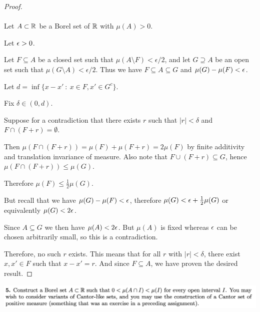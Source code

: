 \begin{proof}~\\~\\
  Let $A \subset \mathbb{R}$ be a Borel set of $\mathbb{R}$ with $\mu(A) > 0$.

  Let $\epsilon > 0$.

  Let $F \subseteq A$ be a closed set such that $\mu(A \setminus F) < \epsilon/2$, and let $G \supseteq A$ be
  an open set such that $\mu(G \setminus A) < \epsilon/2$. Thus we have $F \subseteq A \subseteq G$
  and $\mu(G) - \mu(F) < \epsilon$.

  Let $d = \inf \{ x - x' ~:~ x \in F, x' \in G^c\}$.

  Fix $\delta \in (0, d)$.

  Suppose for a contradiction that there exists $r$ such that $|r| < \delta$ and $F \cap (F + r) = \emptyset$.

  Then $\mu(F \cap (F + r)) = \mu(F) + \mu(F + r) = 2\mu(F)$ by finite additivity and translation invariance of
  measure. Also note that $F \cup (F + r) \subseteq G$, hence $\mu(F \cap (F + r)) \leq \mu(G)$.

  Therefore $\mu(F) \leq \frac{1}{2}\mu(G)$.

  But recall that we have $\mu(G) - \mu(F) < \epsilon$, therefore $\mu(G) < \epsilon + \frac{1}{2}\mu(G)$ or
  equivalently $\mu(G) < 2\epsilon$.

  Since $A \subseteq G$ we then have $\mu(A) < 2\epsilon$. But $\mu(A)$ is fixed whereas $\epsilon$ can be chosen
  arbitrarily small, so this is a contradiction.

  Therefore, no such $r$ exists. This means that for all $r$ with $|r| < \delta$, there exist $x, x' \in F$
  such that $x - x' = r$. And since $F \subseteq A$, we have proven the desired result.
\end{proof}


\newpage
\begin{mdframed}
\includegraphics[width=400pt]{img/analysis--berkeley-202a-hw05-40cd.png}
\end{mdframed}

